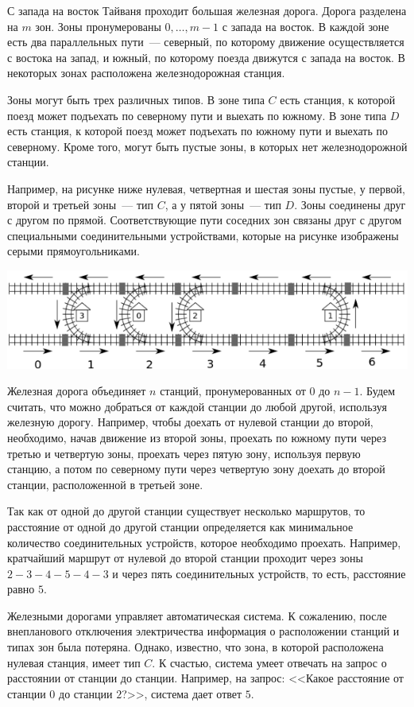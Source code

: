 С запада на восток Тайваня проходит большая железная дорога. Дорога разделена на $m$ зон.
Зоны пронумерованы $0, \ldots, m - 1$ с запада на восток. В каждой зоне есть два
параллельных пути~--- северный, по которому движение осуществляется с востока на запад, и
южный, по которому поезда движутся с запада на восток. В некоторых зонах расположена
железнодорожная станция.

Зоны могут быть трех различных типов. В зоне типа $C$ есть станция, к которой поезд может
подъехать по северному пути и выехать по южному. В зоне типа $D$ есть станция, к которой
поезд может подъехать по южному пути и выехать по северному. Кроме того, могут быть
пустые зоны, в которых нет железнодорожной станции.

Например, на рисунке ниже нулевая, четвертная и шестая зоны пустые, у первой, второй и
третьей зоны~--- тип $C$, а у пятой зоны~--- тип $D$. Зоны соединены друг с другом по прямой. Соответствующие пути соседних зон связаны друг с другом специальными соединительными устройствами, которые на рисунке изображены серыми прямоугольниками.

\includegraphics[scale=0.7]{1.png}

Железная дорога объединяет $n$ станций, пронумерованных от $0$ до $n - 1$. Будем считать,
что можно добраться от каждой станции до любой другой, используя железную дорогу.
Например, чтобы доехать от нулевой станции до второй, необходимо, начав движение из
второй зоны, проехать по южному пути через третью и четвертую зоны, проехать через пятую
зону, используя первую станцию, а потом по северному пути через четвертую зону доехать до
второй станции, расположенной в третьей зоне.

Так как от одной до другой станции существует несколько маршрутов, то расстояние от одной
до другой станции определяется как минимальное количество соединительных устройств,
которое необходимо проехать. Например, кратчайший маршрут от нулевой до второй станции
проходит через зоны $2-3-4-5-4-3$ и через пять соединительных устройств, то есть, расстояние
равно $5$.

Железными дорогами управляет автоматическая система. К сожалению, после внепланового
отключения электричества информация о расположении станций и типах зон была потеряна.
Однако, известно, что зона, в которой расположена нулевая станция, имеет тип $C$. К счастью, система умеет отвечать на запрос о расстоянии от станции до станции. Например, на запрос: <<Какое расстояние от станции $0$ до станции $2$?>>, система дает ответ $5$.

